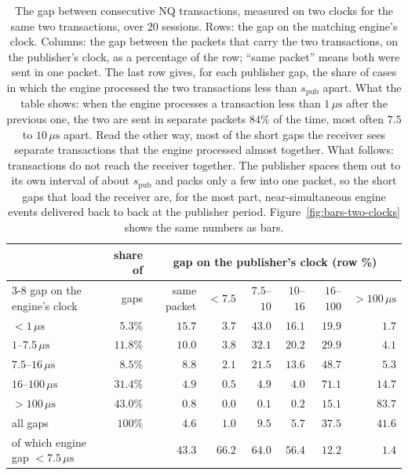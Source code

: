 \documentclass[11pt]{article}
\newcommand{\spub}{s_{\mathrm{pub}}}
\begin{document}
\begin{table}[H]
\centering
\small
\begin{tabular}{@{}l r rrrrrr@{}}
\toprule
 & share of & \multicolumn{6}{c}{gap on the publisher's clock (row \%)} \\
\cmidrule(l){3-8}
gap on the engine's clock & gaps & same packet & $<7.5$ & $7.5$--$10$ & $10$--$16$ & $16$--$100$ & $>100\,\mu\mathrm{s}$ \\
\midrule
$< 1\,\mu\mathrm{s}$            & $5.3\%$  & $15.7$ & $3.7$ & $43.0$ & $16.1$ & $19.9$ & $1.7$ \\
$1$--$7.5\,\mu\mathrm{s}$       & $11.8\%$ & $10.0$ & $3.8$ & $32.1$ & $20.2$ & $29.9$ & $4.1$ \\
$7.5$--$16\,\mu\mathrm{s}$      & $8.5\%$  & $8.8$  & $2.1$ & $21.5$ & $13.6$ & $48.7$ & $5.3$ \\
$16$--$100\,\mu\mathrm{s}$      & $31.4\%$ & $4.9$  & $0.5$ & $4.9$  & $4.0$  & $71.1$ & $14.7$ \\
$> 100\,\mu\mathrm{s}$          & $43.0\%$ & $0.8$  & $0.0$ & $0.1$  & $0.2$  & $15.1$ & $83.7$ \\
\midrule
all gaps                        & $100\%$  & $4.6$  & $1.0$ & $9.5$  & $5.7$  & $37.5$ & $41.6$ \\
\quad of which engine gap $< 7.5\,\mu\mathrm{s}$ & & $43.3$ & $66.2$ & $64.0$ & $56.4$ & $12.2$ & $1.4$ \\
\bottomrule
\end{tabular}
\caption{The gap between consecutive NQ transactions, measured on two clocks for the same two
transactions, over 20 sessions. Rows: the gap on the matching engine's clock. Columns: the
gap between the packets that carry the two transactions, on the publisher's clock, as a
percentage of the row; ``same packet'' means both were sent in one packet. The last row
gives, for each publisher gap, the share of cases in which the engine processed the two
transactions less than $\spub$ apart. What the table shows: when the engine
processes a transaction less than $1\,\mu\mathrm{s}$ after the previous one, the two are
sent in separate packets $84\%$ of the time, most often $7.5$ to $10\,\mu\mathrm{s}$ apart.
Read the other way, most of the short gaps the receiver sees separate transactions that
the engine processed almost together. What follows: transactions do not reach the
receiver together. The publisher spaces them out to its own interval of about
$\spub$ and packs only a few into one packet, so the short gaps that load the
receiver are, for the most part, near-simultaneous engine events delivered back to back at
the publisher period. Figure~\ref{fig:bars-two-clocks} shows the same numbers as bars.}
\label{tab:two-clocks}
\end{table}
\end{document}
